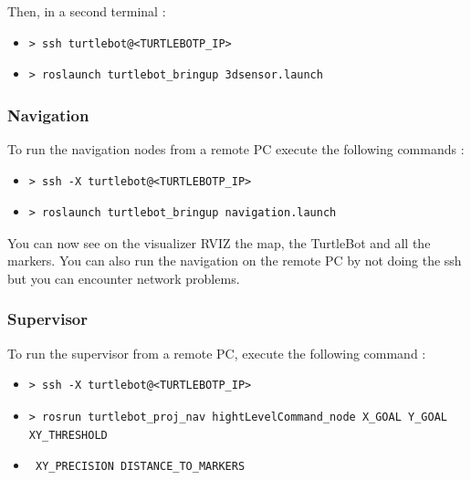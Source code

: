 \documentclass[10pt,a4paper]{article}
\begin{document}
Then, in a second terminal :

\begin{itemize}
\item[]  \begin{verbatim}> ssh turtlebot@<TURTLEBOTP_IP> \end{verbatim}
\item[]  \begin{verbatim}> roslaunch turtlebot_bringup 3dsensor.launch \end{verbatim}
\end{itemize}

\subsubsection{Navigation}

To run the navigation nodes from a remote PC execute the following commands :

\begin{itemize}
\item[]  \begin{verbatim}> ssh -X turtlebot@<TURTLEBOTP_IP> \end{verbatim}
\item[]  \begin{verbatim}> roslaunch turtlebot_bringup navigation.launch \end{verbatim}
\end{itemize}

You can now see on the visualizer RVIZ the map, the TurtleBot and all the markers. You can also run the navigation on the remote PC by not doing the ssh but you can encounter network problems.

\subsubsection{Supervisor}

To run the supervisor from a remote PC, execute the following command :

\begin{itemize}
\item[]  \begin{verbatim}> ssh -X turtlebot@<TURTLEBOTP_IP> \end{verbatim}
\item[]  \begin{verbatim}> rosrun turtlebot_proj_nav hightLevelCommand_node X_GOAL Y_GOAL XY_THRESHOLD  \end{verbatim}
\item[]  \begin{verbatim} XY_PRECISION DISTANCE_TO_MARKERS \end{verbatim}
\end{itemize}
\end{document}
